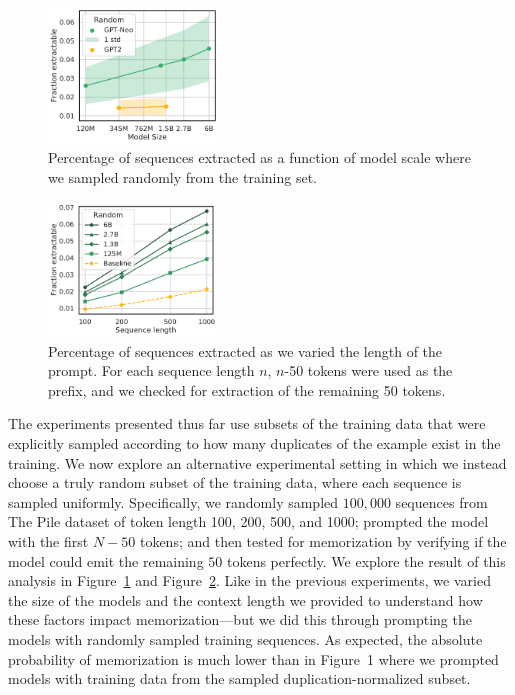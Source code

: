 \begin{figure}[h]
    \centering
    \includegraphics[width=0.4\textwidth]{figures/random-exactly_mem-vs-model_size-prompt-all-gen-50-xlabel-ylabel} 
    \caption{Percentage of sequences extracted as a function of model scale where we sampled randomly from the training set. }
    \label{fig:other_approaches_randomsize}
\end{figure}

\begin{figure}[h]
    \centering
    \includegraphics[width=0.4\textwidth]{figures/random_exactly_mem-vs-prompt_len-seq-varyseqlen-gen-50-xlabel-ylabel-markers} %
    \caption{Percentage of sequences extracted as we varied the length of the prompt. For each sequence length $n$, $n$-50 tokens were used as the prefix, and we checked for extraction of the remaining 50 tokens.}
    \label{fig:other_approaches_randomlength}
\end{figure}


The experiments presented thus far use subsets of the training data that were explicitly sampled according to how many duplicates of the example exist in the training.
%
We now explore an alternative experimental setting in which we instead choose a
truly random subset of the training data, where each sequence is sampled uniformly.
%
Specifically, we randomly sampled $100,000$ sequences
from The Pile dataset of token length 100, 200, 500, and 1000;
prompted the model with the first $N-50$ tokens; and then
tested for memorization by verifying if the model could emit the remaining $50$ tokens perfectly.    
%
We explore the result of this analysis in
Figure~\ref{fig:other_approaches_randomsize} and Figure~\ref{fig:other_approaches_randomlength}.
Like in the previous experiments, we varied the size of the models and the
context length we provided to understand how these factors impact memorization---but we did this through prompting the models
with randomly sampled training sequences.
%
As expected, the absolute probability of memorization is much lower than in Figure~1 where we prompted models with training data from the sampled duplication-normalized subset.

